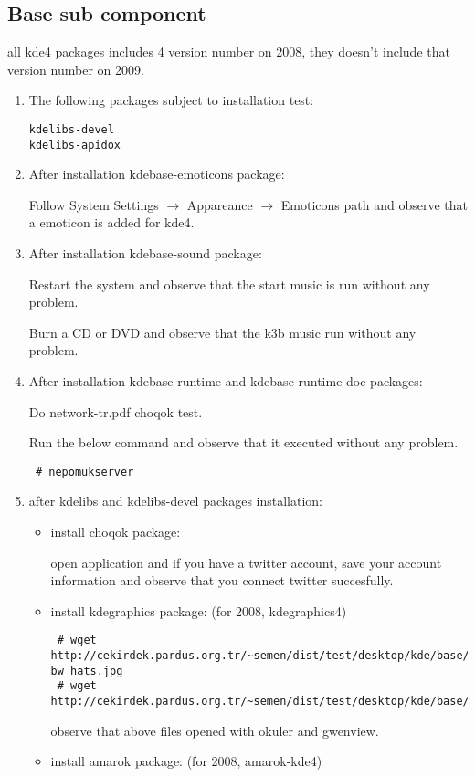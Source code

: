 \documentclass[a4paper,10pt]{article}
\begin{document}
\subsection*{Base sub component}
all kde4 packages includes 4 version number on 2008, they doesn't include that version number on 2009.
\begin{enumerate} 
\item The following packages subject to installation test:
\begin{verbatim}
kdelibs-devel
kdelibs-apidox 
\end{verbatim}
\item After installation kdebase-emoticons package:

Follow System Settings $\rightarrow$ Appareance $\rightarrow$ Emoticons path and observe that a emoticon is added for kde4.
\item After installation kdebase-sound package:

Restart the system and observe that the start music is run without any problem.

Burn a CD or DVD and observe that the k3b music run without any problem.

\item After installation kdebase-runtime and kdebase-runtime-doc packages:

Do network-tr.pdf choqok test.

Run the below command and observe that it executed without any problem.
\begin{verbatim}
 # nepomukserver
\end{verbatim}

 \item after kdelibs and kdelibs-devel packages installation:
\begin{itemize}
 \item install choqok package: 

open application and if you have a twitter account, save your account information and observe that you connect twitter succesfully.
 \item install kdegraphics package: (for 2008, kdegraphics4)
\begin{verbatim}
 # wget http://cekirdek.pardus.org.tr/~semen/dist/test/desktop/kde/base/circus-bw_hats.jpg
 # wget http://cekirdek.pardus.org.tr/~semen/dist/test/desktop/kde/base/tepecik_01.png
\end{verbatim}
observe that above files opened with okuler and gwenview.
\item install amarok package: (for 2008, amarok-kde4) 


\end{itemize}
\end{enumerate}
\end{document}
